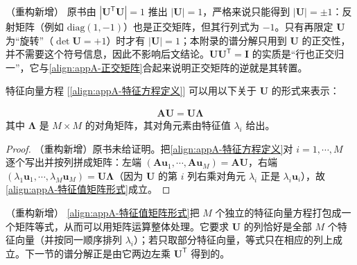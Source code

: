 \documentclass[../main.tex]{subfiles}
\begin{document}
\begin{remark}（重构新增）
原书由 $|\bm{U}^{\mathsf{T}}\bm{U}|=1$ 推出 $|\bm{U}|=1$，严格来说只能得到 $|\bm{U}|=\pm1$：反射矩阵（例如 $\mathrm{diag}(1,-1)$）也是正交矩阵，但其行列式为 $-1$。只有再限定 $\bm{U}$ 为“旋转”（$\det\bm{U}=+1$）时才有 $|\bm{U}|=1$；本附录的谱分解只用到 $\bm{U}$ 的正交性，并不需要这个符号信息，因此不影响后文结论。$\bm{U}\bm{U}^{\mathsf{T}}=\bm{I}$ 的实质是“行也正交归一”，它与\eqref{align:appA-正交矩阵}合起来说明正交矩阵的逆就是其转置。
\end{remark}

特征向量方程 [\eqref{align:appA-特征方程定义}] 可以用以下关于 $\bm{U}$ 的形式来表示：
\begin{proposition}[特征向量方程的矩阵形式]\label{proposition:appA-特征值分解矩阵形式}
\begin{align}
  \bm{A}\bm{U}=\bm{U}\bm{\Lambda}
  \label{align:appA-特征值矩阵形式}
\end{align}
其中 $\bm{\Lambda}$ 是 $M\times M$ 的对角矩阵，其对角元素由特征值 $\lambda_i$ 给出。
\end{proposition}

\begin{proof}
（重构新增）原书未给证明。把\eqref{align:appA-特征方程定义}对 $i=1,\cdots,M$ 逐个写出并按列拼成矩阵：左端 $(\bm{A}\bm{u}_1,\cdots,\bm{A}\bm{u}_M)=\bm{A}\bm{U}$，右端 $(\lambda_1\bm{u}_1,\cdots,\lambda_M\bm{u}_M)=\bm{U}\bm{\Lambda}$（因为 $\bm{U}$ 的第 $i$ 列右乘对角元 $\lambda_i$ 正是 $\lambda_i\bm{u}_i$），故\eqref{align:appA-特征值矩阵形式}成立。
\end{proof}

\begin{remark}（重构新增）
\eqref{align:appA-特征值矩阵形式}把 $M$ 个独立的特征向量方程打包成一个矩阵等式，从而可以用矩阵运算整体处理。它要求 $\bm{U}$ 的列恰好是全部 $M$ 个特征向量（并按同一顺序排列 $\lambda_i$）；若只取部分特征向量，等式只在相应的列上成立。下一节的谱分解正是由它两边左乘 $\bm{U}^{\mathsf{T}}$ 得到的。
\end{remark}
\end{document}
